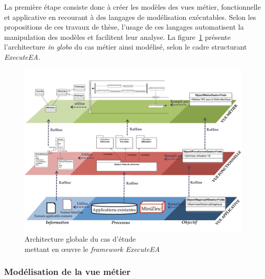     La première étape consiste donc à créer les modèles des vues métier, fonctionnelle
    et applicative en recourant à des langages de modélisation exécutables. Selon les
    propositions de ces travaux de thèse, l'usage de ces langages automatisent
    la manipulation des modèles et facilitent leur analyse. La
    figure~\ref{fig:architecture_generale_usecase} présente l'architecture \emph{in globo}
    du cas métier ainsi modélisé, selon le cadre structurant \emph{ExecuteEA}.








\begin{figure}[!htbp]
 \begin{center}
  \includegraphics[angle=90, width=1\textwidth]{figures/5_implementation/architecture_generale_usecase.pdf}
 \end{center}
 \caption{Architecture globale du cas d'étude \\mettant en œuvre le \protect\emph{framework ExecuteEA}}
 \label{fig:architecture_generale_usecase}
\end{figure}


\subsubsection{Modélisation de la vue métier} 

